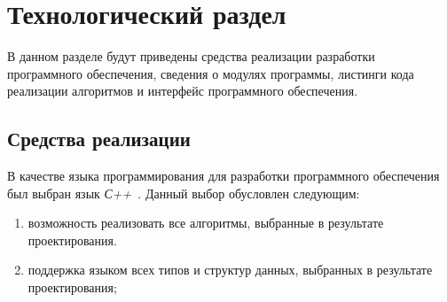 \chapter{Технологический раздел}

В данном разделе будут приведены средства реализации разработки программного обеспечения, сведения о модулях программы, листинги кода реализации алгоритмов и интерфейс программного обеспечения.

\section{Средства реализации}

В качестве языка программирования для разработки программного обеспечения был выбран язык \textit{С++}~\cite{cplusplus}.
Данный выбор обусловлен следующим: 
\begin{enumerate}
	\item возможность реализовать все алгоритмы, выбранные в результате проектирования.
	\item поддержка языком всех типов и структур данных, выбранных в результате
	проектирования;
\end{enumerate}


